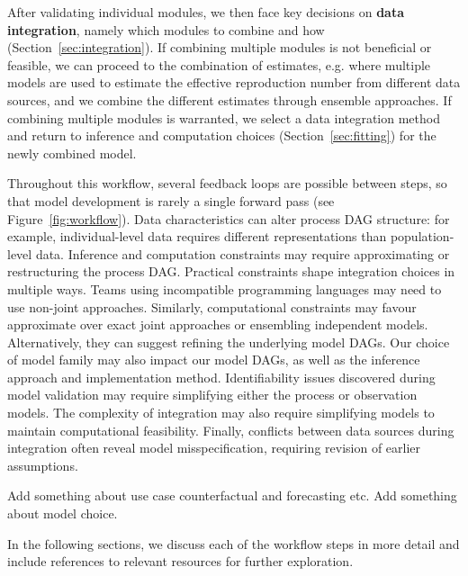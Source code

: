 \documentclass{article}
\begin{document}
After validating individual modules, we then face key decisions on \textbf{data integration}, namely which modules to combine and how  (Section~\ref{sec:integration}). If combining multiple modules is not beneficial or feasible, we can proceed to the combination of estimates, e.g. where multiple models are used to estimate the effective reproduction number from different data sources, and we combine the different estimates through ensemble approaches. If combining multiple modules is warranted, we select a data integration method and return to inference and computation choices (Section~\ref{sec:fitting}) for the newly combined model.

Throughout this workflow, several feedback loops are possible between steps, so that model development is rarely a single forward pass (see Figure~\ref{fig:workflow}). 
Data characteristics can alter process \ac{DAG} structure: for example, individual-level data requires different representations than population-level data. 
Inference and computation constraints may require approximating or restructuring the process \ac{DAG}.
Practical constraints shape integration choices in multiple ways. 
Teams using incompatible programming languages may need to use non-joint approaches. 
Similarly, computational constraints may favour approximate over exact joint approaches or ensembling independent models.
Alternatively, they can suggest refining the underlying model \ac{DAG}s.
Our choice of model family may also impact our model \ac{DAG}s, as well as the inference approach and implementation method.
Identifiability issues discovered during model validation may require simplifying either the process or observation models. 
The complexity of  integration may also require simplifying models to maintain computational feasibility. 
Finally, conflicts between data sources during integration often reveal model misspecification, requiring revision of earlier assumptions.

Add something about use case counterfactual and forecasting etc.
Add something about model choice.

In the following sections, we discuss each of the workflow steps in more detail and include references to relevant resources for further exploration.
\end{document}
